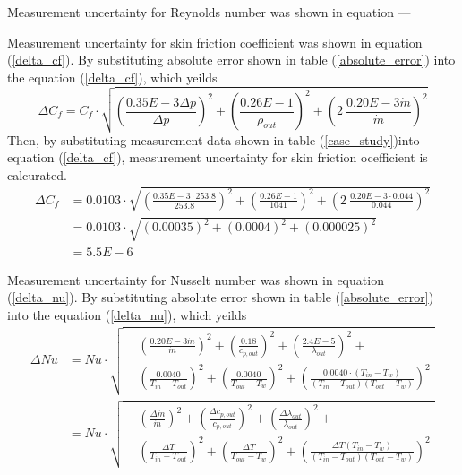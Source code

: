 \documentclass[12pt,oneside]{jbook}
\begin{document}
Measurement uncertainty for Reynolds number was shown in equation ---


Measurement uncertainty for skin friction coefficient was shown in equation (\ref{delta_cf}).
By substituting absolute error shown in table (\ref{absolute_error}) into the equation (\ref{delta_cf}), which yeilds
\begin{equation}
   \Delta C_{f} = C_{f} \cdot \sqrt{\left( \frac{0.35E-3\Delta p}{\Delta p}\right)^{2} + \left(\frac{0.26E-1}{\rho_{out}}\right)^{2} + \left( 2\ \frac{0.20E-3\dot{m}}{\dot{m}}\right)^{2}}
   \label{case_study_cf1}
\end{equation}
Then, by substituting measurement data shown in table (\ref{case_study})into equation (\ref{delta_cf}), measurement uncertainty for skin friction ocefficient is calcurated.
\begin{align}
    \Delta C_{f} & = 0.0103 \cdot \sqrt{\left( \frac{0.35E-3\cdot 253.8}{253.8}\right)^{2} + \left(\frac{0.26E-1}{1041}\right)^{2} +   \left( 2\ \frac{0.20E-3\cdot 0.044}{0.044}\right)^{2}}\\
    &= 0.0103 \cdot \sqrt{ \left( 0.00035 \right)^{2} + \left( 0.0004 \right)^{2} + \left( 0.000025 \right)^{2} }\\
    &= 5.5E-6
   \label{case_study_cf2}
\end{align}

Measurement uncertainty for Nusselt number was shown in equation (\ref{delta_nu}).
By substituting absolute error shown in table (\ref{absolute_error}) into the equation (\ref{delta_nu}), which yeilds
\begin{align}
    \Delta Nu & = Nu\cdot
    \sqrt{
    \begin{aligned}
        & \left(\frac{0.20E-3\dot{m}}{\dot{m}}\right)^{2}
        + \left(\frac{0.18}{c_{p,out}}\right)^{2}
        + \left(\frac{2.4E-5}{\lambda_{out}}\right)^{2}+\\
        & \left(\frac{0.0040}{T_{in} - T_{out}}\right)^{2}
        + \left(\frac{0.0040}{T_{out} - T_{w}}\right)^{2}
        + \left(\frac{0.0040\cdot \left( T_{in} - T_{w}\right)}{\left( T_{in} - T_{out}\right)\left( T_{out}-T_{w} \right)} \right)^{2}
    \end{aligned}
    }\\
    & = Nu\cdot
    \sqrt{
    \begin{aligned}
        & \left(\frac{\Delta \dot{m}}{\dot{m}}\right)^{2}
        + \left(\frac{\Delta c_{p,out}}{c_{p,out}}\right)^{2}
        + \left(\frac{\Delta \lambda_{out}}{\lambda_{out}}\right)^{2}+\\
        & \left(\frac{\Delta T}{T_{in} - T_{out}}\right)^{2}
        + \left(\frac{\Delta T}{T_{out} - T_{w}}\right)^{2}
        + \left(\frac{\Delta T\left( T_{in} - T_{w}\right)}{\left( T_{in} - T_{out}\right)\left( T_{out}-T_{w} \right)} \right)^{2}
        \end{aligned}
        }
\end{align}
\end{document}
